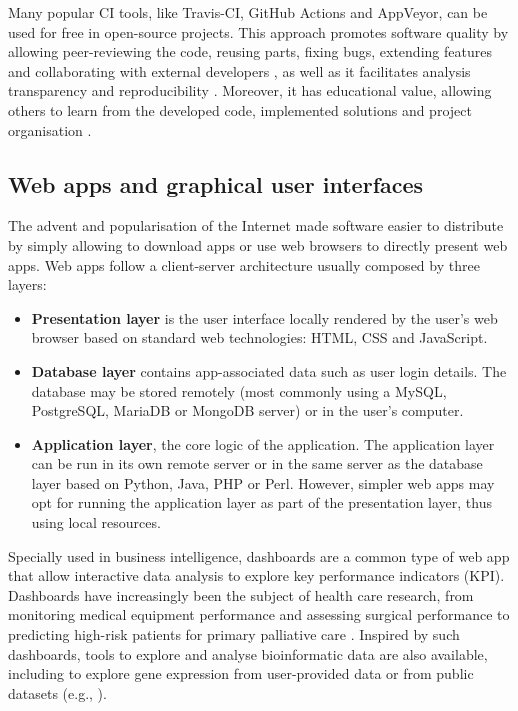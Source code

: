 Many popular CI tools, like Travis-CI, GitHub Actions and AppVeyor, can be used for free in open-source projects. This approach promotes software quality by allowing peer-reviewing the code, reusing parts, fixing bugs, extending features and collaborating with external developers \cite{silva:2017wl,hewitt:2019uj}, as well as it facilitates analysis transparency and reproducibility \cite{silva:2017wl}. Moreover, it has educational value, allowing others to learn from the developed code, implemented solutions and project organisation \cite{hewitt:2019uj}.


\subsection{Web apps and graphical user interfaces}

The advent and popularisation of the Internet made software easier to distribute by simply allowing to download apps or use web browsers to directly present web apps. Web apps follow a client-server architecture usually composed by three layers:
\begin{itemize}
	\item \textbf{Presentation layer} is the user interface locally rendered by the user's web browser based on standard web technologies: HTML, CSS and JavaScript.
	\item \textbf{Database layer} contains app-associated data such as user login details. The database may be stored remotely (most commonly using a MySQL, PostgreSQL, MariaDB or MongoDB server) or in the user's computer.
	\item \textbf{Application layer}, the core logic of the application. The application layer can be run in its own remote server or in the same server as the database layer based on Python, Java, PHP or Perl. However, simpler web apps may opt for running the application layer as part of the presentation layer, thus using local resources.
\end{itemize}

Specially used in business intelligence, dashboards are a common type of web app that allow interactive data analysis to explore key performance indicators (KPI). Dashboards have increasingly been the subject of health care research, from monitoring medical equipment performance \cite{iadanza:2019tj} and assessing surgical performance \cite{baghdadi:2021uc} to predicting high-risk patients for primary palliative care \cite{tan:2020tu}. Inspired by such dashboards, tools to explore and analyse bioinformatic data are also available, including to explore gene expression from user-provided data or from public datasets (e.g., \cite{reyes:2019ud,cardoso-moreira:2019wd}).

